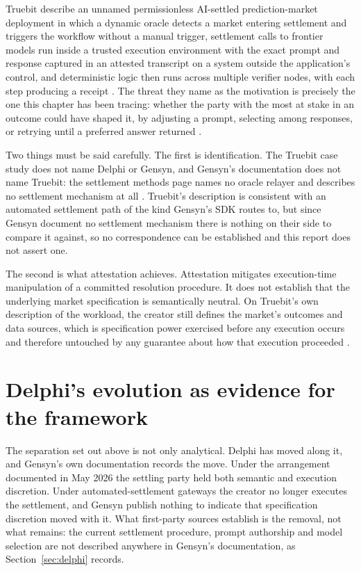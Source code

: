 Truebit describe an unnamed permissionless AI-settled prediction-market deployment in which
a dynamic oracle detects a market entering settlement and triggers the workflow without a
manual trigger, settlement calls to frontier models run inside a trusted execution
environment with the exact prompt and response captured in an attested transcript on
a system outside the application's control, and deterministic logic then runs
across multiple verifier nodes, with each step producing a receipt
\cite{truebit2026orchestration}. The threat they name as the motivation is precisely the one
this chapter has been tracing: whether the party with the most at stake in an outcome could
have shaped it, by adjusting a prompt, selecting among responses, or retrying until a
preferred answer returned \cite{truebit2026orchestration}.

Two things must be said carefully. The first is identification. The Truebit case study does
not name Delphi or Gensyn, and Gensyn's documentation does not name Truebit: the settlement
methods page names no oracle relayer and describes no settlement mechanism at all
\cite{gensyn2026sdk,truebit2026orchestration}. Truebit's description is consistent with an
automated settlement path of the kind Gensyn's SDK routes to, but since Gensyn document no
settlement mechanism there is nothing on their side to compare it against, so no
correspondence can be established and this report does not assert one.

The second is what attestation achieves. Attestation mitigates execution-time manipulation
of a committed resolution procedure. It does not establish that the underlying market
specification is semantically neutral. On Truebit's own description of the workload, the
creator still defines the market's outcomes and data sources, which is specification power
exercised before any execution occurs and therefore untouched by any guarantee about how
that execution proceeded \cite{truebit2026orchestration}.

\section{Delphi's evolution as evidence for the framework}
\label{sec:evolution}

The separation set out above is not only analytical. Delphi has moved along it, and Gensyn's
own documentation records the move. Under the arrangement documented in May 2026 the
settling party held both semantic and execution discretion. Under automated-settlement
gateways the creator no longer executes the settlement, and Gensyn publish nothing to
indicate that specification discretion moved with it. What first-party sources establish is
the removal, not what remains: the current settlement procedure, prompt authorship and model
selection are not described anywhere in Gensyn's documentation, as
Section~\ref{sec:delphi} records.


